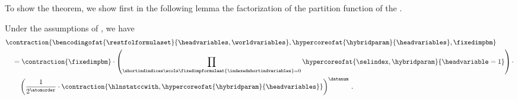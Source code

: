 To show the theorem, we show first in the following lemma the factorization of the partition function of the \HybridFOLNetwork{}.

\begin{lemma}
    \label{lem:FOLpartitionfunctionfactorization}
    Under the assumptions of , we have
    \begin{align*}
        &\contraction{
            \bencodingofat{\restfolformulaset}{\headvariables,\worldvariables},\hypercoreofat{\hybridparam}{\headvariables},\fixedimpbm
        } \\
        &\quad=\contraction{\fixedimpbm} \cdot
        \left(  \prod_{\shortindindices\wcols\fixedimpformulaat{\indexedshortindvariables}=0} \hypercoreofat{\selindex,\hybridparam}{\headvariable=1}\right) \cdot \\
        &\quad\quad \left(\frac{1}{2^{\atomorder}}
        \cdot \contraction{\hlnstatccwith,\hypercoreofat{\hybridparam}{\headvariables}}
        \right)^{\datanum} \, .
    \end{align*}
\end{lemma}
